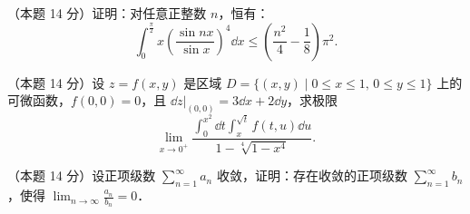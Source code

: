 \begin{problems}
\item[四、]（本题 14 分）证明：对任意正整数 $n$，恒有：
\[
  \int_0^{\frac{\pi}{2}}x\left(\frac{\sin nx}{\sin x}\right)^4\dd x\le\left(\frac{n^2}{4}-\frac18\right)\pi^2.
\]

\item[五、]（本题 14 分）设 $z=f(x,y)$ 是区域 $D=\{(x,y)\mid 0\le x\le1,\,0\le y\le1\}$ 上的可微函数，$f(0,0)=0$，且 $\dd z\big|_{(0,0)}=3\dd x+2\dd y$，求极限
\[
  \lim_{x\to0^+}\frac{\displaystyle\int_0^{x^2}\dd t\int_x^{\sqrt t}f(t,u)\dd u}{1-\sqrt[4]{1-x^4}}.
\]

\item[六、]（本题 14 分）设正项级数 $\displaystyle \sum_{n=1}^{\infty}a_n$ 收敛，证明：存在收敛的正项级数 $\displaystyle \sum_{n=1}^{\infty}b_n$，使得 $\displaystyle \lim_{n\to\infty}\frac{a_n}{b_n}=0$．
\end{problems}
